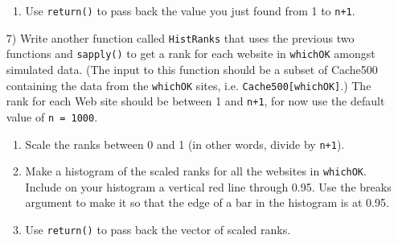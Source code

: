 \documentclass[11pt]{article}
\begin{document}
\begin{itemize}
\begin{enumerate}
\item Use {\tt return()} to pass back the value you just found from 1 to {\tt n+1}.
\end{enumerate}


\item[7)]  Write another function called {\tt HistRanks} that uses the previous two functions and {\tt sapply()} to get a rank for each website in {\tt whichOK} amongst simulated data.  (The input to this function should be a subset of Cache500 containing the data from the {\tt whichOK} sites, i.e. {\tt Cache500[whichOK]}.) The rank for each Web site should be between 1 and {\tt n+1}, for now use the default value of {\tt n = 1000}.

\begin{enumerate}
\item Scale the ranks between 0 and 1 (in other words, divide by {\tt n+1}).

\item Make a histogram of the scaled ranks for all the websites in {\tt whichOK}.  Include on your histogram a vertical red line through 0.95.  Use the breaks argument to make it so that the edge of a bar in the histogram is at 0.95.

\item Use {\tt return()} to pass back the vector of scaled ranks.
\end{enumerate}

\end{itemize}
\end{document}
